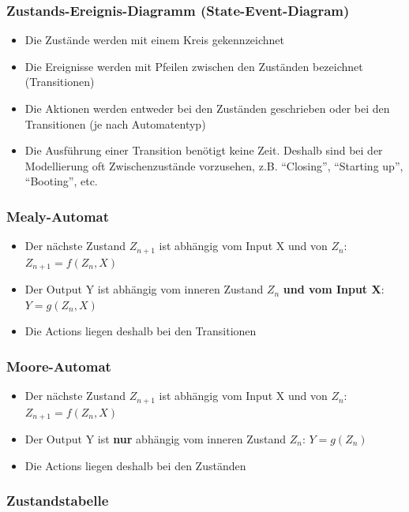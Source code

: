 \subsubsection{Zustands-Ereignis-Diagramm (State-Event-Diagram)}
\begin{itemize}
  \item Die Zustände werden mit einem Kreis gekennzeichnet
  \item Die Ereignisse werden mit Pfeilen zwischen den Zuständen bezeichnet
  (Transitionen)
  \item Die Aktionen werden entweder bei den Zuständen geschrieben oder bei den
  Transitionen (je nach Automatentyp)
  \item Die Ausführung einer Transition benötigt keine Zeit. Deshalb sind bei
  der Modellierung oft Zwischenzustände vorzusehen, z.B. "`Closing"', "`Starting
  up"', "`Booting"', etc.
\end{itemize}

\subsubsection{Mealy-Automat}
\begin{itemize}
  	\item Der nächste Zustand $Z_{n+1}$ ist abhängig vom Input X und von $Z_n$:
  	$Z_{n+1}=f(Z_n,X)$
  	\item Der Output Y ist abhängig vom inneren Zustand $Z_n$ \textbf{und vom
 	 Input X}: $Y=g(Z_n, X)$
  	\item Die Actions liegen deshalb bei den Transitionen
\end{itemize}

\subsubsection{Moore-Automat}
\begin{itemize}
	\item Der nächste Zustand $Z_{n+1}$ ist abhängig vom Input X und von $Z_n$:
  	$Z_{n+1}=f(Z_n,X)$
  	\item Der Output Y ist \textbf{nur} abhängig vom inneren Zustand $Z_n$: $Y=g(Z_n)$
  	\item Die Actions liegen deshalb bei den Zuständen
\end{itemize}


\subsubsection{Zustandstabelle}

